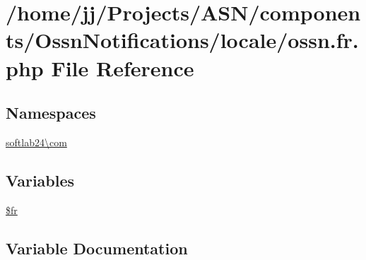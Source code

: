 \hypertarget{components_2_ossn_notifications_2locale_2ossn_8fr_8php}{}\section{/home/jj/\+Projects/\+A\+S\+N/components/\+Ossn\+Notifications/locale/ossn.fr.\+php File Reference}
\label{components_2_ossn_notifications_2locale_2ossn_8fr_8php}
\subsection*{Namespaces}
\begin{DoxyCompactItemize}
\item 
 \hyperlink{namespacesoftlab24_1_1com}{softlab24\textbackslash{}com}
\end{DoxyCompactItemize}
\subsection*{Variables}
\begin{DoxyCompactItemize}
\item 
\hyperlink{components_2_ossn_notifications_2locale_2ossn_8fr_8php_ad5107c697816e7b7f89ad1b3e94e3e0e}{\$fr}
\end{DoxyCompactItemize}


\subsection{Variable Documentation}
